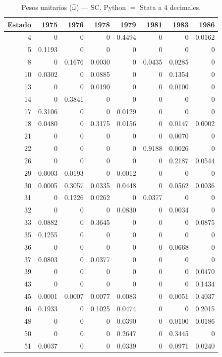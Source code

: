 \begin{table}[H]
\centering
\caption{Pesos unitarios ($\hat{\omega}$) --- SC. Python $=$ Stata a 4 decimales.}
\label{tab:omega_sc}
\small
\begin{tabular}{rrrrrrrr}
\toprule
Estado & 1975 & 1976 & 1978 & 1979 & 1981 & 1983 & 1986 \\
\midrule
4 & 0 & 0 & 0 & 0.4494 & 0 & 0 & 0.0162 \\
5 & 0.1193 & 0 & 0 & 0 & 0 & 0 & 0 \\
8 & 0 & 0.1676 & 0.0030 & 0 & 0.0435 & 0.0285 & 0 \\
10 & 0.0302 & 0 & 0.0885 & 0 & 0 & 0.1354 & 0 \\
13 & 0 & 0 & 0.0190 & 0 & 0 & 0.0100 & 0 \\
14 & 0 & 0.3841 & 0 & 0 & 0 & 0 & 0 \\
17 & 0.3106 & 0 & 0 & 0.0129 & 0 & 0 & 0 \\
18 & 0.0480 & 0 & 0.3175 & 0.0156 & 0 & 0.0147 & 0.0002 \\
21 & 0 & 0 & 0 & 0 & 0 & 0.0070 & 0 \\
22 & 0 & 0 & 0 & 0 & 0.9188 & 0.0026 & 0 \\
26 & 0 & 0 & 0 & 0 & 0 & 0.2187 & 0.0544 \\
29 & 0.0003 & 0.0193 & 0 & 0.0012 & 0 & 0 & 0 \\
30 & 0.0005 & 0.3057 & 0.0335 & 0.0448 & 0 & 0.0562 & 0.0036 \\
31 & 0 & 0.1226 & 0.0262 & 0 & 0.0377 & 0 & 0 \\
32 & 0 & 0 & 0 & 0.0830 & 0 & 0.0034 & 0 \\
33 & 0.0882 & 0 & 0.3645 & 0 & 0 & 0 & 0.0875 \\
35 & 0.1255 & 0 & 0 & 0 & 0 & 0 & 0 \\
36 & 0 & 0 & 0 & 0 & 0 & 0.0668 & 0 \\
37 & 0.0803 & 0 & 0.0377 & 0 & 0 & 0 & 0 \\
39 & 0 & 0 & 0 & 0 & 0 & 0 & 0.0470 \\
43 & 0 & 0 & 0 & 0 & 0 & 0 & 0.1434 \\
45 & 0.0001 & 0.0007 & 0.0077 & 0.0083 & 0 & 0.0051 & 0.4037 \\
46 & 0.1933 & 0 & 0.1025 & 0.0474 & 0 & 0 & 0.2015 \\
48 & 0 & 0 & 0 & 0.0390 & 0 & 0.0100 & 0.0186 \\
50 & 0 & 0 & 0 & 0.2647 & 0 & 0.3445 & 0 \\
51 & 0.0037 & 0 & 0 & 0.0339 & 0 & 0.0971 & 0.0240 \\
\bottomrule
\end{tabular}
\end{table}

